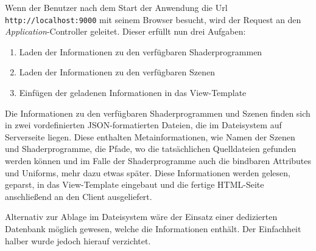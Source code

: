 Wenn der Benutzer nach dem Start der Anwendung die Url \texttt{http://localhost:9000} mit seinem Browser besucht, wird der Request an den \textit{Application}-Controller geleitet. Dieser erfüllt nun drei Aufgaben:
\begin{enumerate}
    \item Laden der Informationen zu den verfügbaren Shaderprogrammen
    \item Laden der Informationen zu den verfügbaren Szenen
    \item Einfügen der geladenen Informationen in das View-Template
\end{enumerate}
Die Informationen zu den verfügbaren Shaderprogrammen und Szenen finden sich in zwei vordefinierten JSON-formatierten Dateien, die im Dateisystem auf Serverseite liegen. Diese enthalten Metainformationen, wie Namen der Szenen und Shaderprogramme, die Pfade, wo die tatsächlichen Quelldateien gefunden werden können und im Falle der Shaderprogramme auch die bindbaren Attributes und Uniforms, mehr dazu etwas später. Diese Informationen werden gelesen, geparst, in das View-Template eingebaut und die fertige HTML-Seite anschließend an den Client ausgeliefert.

Alternativ zur Ablage im Dateisystem wäre der Einsatz einer dedizierten Datenbank möglich gewesen, welche die Informationen enthält. Der Einfachheit halber wurde jedoch hierauf verzichtet.

